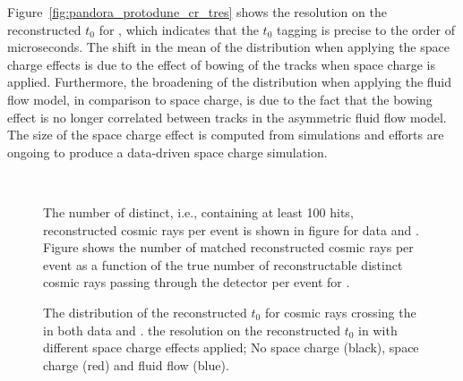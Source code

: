 Figure~\ref{fig:pandora_protodune_cr_tres} shows the resolution on the reconstructed $t_{0}$ for , which indicates that the  $t_{0}$ tagging is precise to the order of microseconds.  The shift in the mean of the distribution when applying the space charge effects is due to the effect of bowing of the tracks when space charge is applied.  Furthermore, the broadening of the distribution when applying the fluid flow model, in comparison to space charge, is due to the fact that the bowing effect is no longer correlated between tracks in the asymmetric fluid flow model. The size of the space charge effect is computed from simulations and efforts are ongoing to produce a data-driven space charge simulation.

\begin{figure}[!ht] %
\centering
{}
 \\
\caption[Reconstructed cosmic rays per event for data and MC]{The number of distinct, i.e., containing at least 100 hits, reconstructed cosmic rays per event is shown in figure \protect{} for data and .  Figure \protect{} shows the number of matched reconstructed cosmic rays per event as a function of the true number of reconstructable distinct cosmic rays passing through the detector per event for .}
\label{fig:pandora_protodune_cr_number}
\end{figure}

\begin{figure}[!ht]  %
\centering
{}
\caption[Distribution of reconstructed $t_{0}$ for cosmic rays]{\protect{} The distribution of the reconstructed $t_{0}$ for cosmic rays crossing the  in both data and .  \protect{} the resolution on the reconstructed $t_{0}$ in  with different space charge effects applied; No space charge (black), space charge (red) and fluid flow (blue).}
\label{fig:pandora_protodune_cr_t0}
\end{figure}


